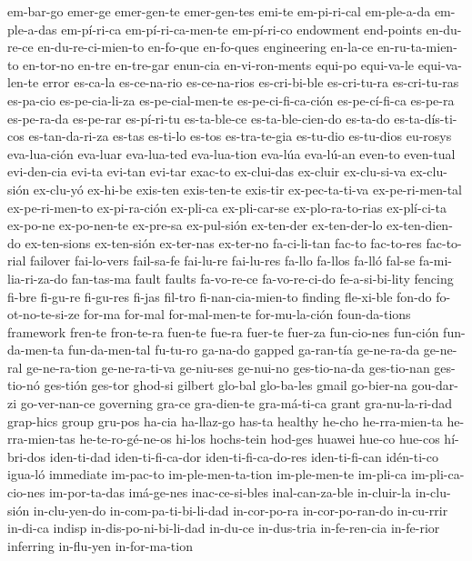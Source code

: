 {  em-bar-go emer-ge emer-gen-te emer-gen-tes emi-te em-pi-ri-cal
  em-ple-a-da em-ple-a-das em-pí-ri-ca em-pí-ri-ca-men-te em-pí-ri-co
  endowment end-points en-du-re-ce en-du-re-ci-mien-to en-fo-que
  en-fo-ques engineering en-la-ce en-ru-ta-mien-to en-tor-no en-tre
  en-tre-gar enun-cia en-vi-ron-ments equi-po equi-va-le equi-va-len-te
  error es-ca-la es-ce-na-rio es-ce-na-rios es-cri-bi-ble es-cri-tu-ra
  es-cri-tu-ras es-pa-cio es-pe-cia-li-za es-pe-cial-men-te
  es-pe-ci-fi-ca-ción es-pe-cí-fi-ca es-pe-ra es-pe-ra-da es-pe-rar
  es-pí-ri-tu es-ta-ble-ce es-ta-ble-cien-do es-ta-do es-ta-dís-ti-cos
  es-tan-da-ri-za es-tas es-ti-lo es-tos es-tra-te-gia es-tu-dio
  es-tu-dios eu-rosys eva-lua-ción eva-luar eva-lua-ted eva-lua-tion
  eva-lúa eva-lú-an even-to even-tual evi-den-cia evi-ta evi-tan
  evi-tar exac-to ex-clui-das ex-cluir ex-clu-si-va ex-clu-sión
  ex-clu-yó ex-hi-be exis-ten exis-ten-te exis-tir ex-pec-ta-ti-va
  ex-pe-ri-men-tal ex-pe-ri-men-to ex-pi-ra-ción ex-pli-ca
  ex-pli-car-se ex-plo-ra-to-rias ex-plí-ci-ta ex-po-ne ex-po-nen-te
  ex-pre-sa ex-pul-sión ex-ten-der ex-ten-der-lo ex-ten-dien-do
  ex-ten-sions ex-ten-sión ex-ter-nas ex-ter-no fa-ci-li-tan fac-to
  fac-to-res fac-to-rial failover fai-lo-vers fail-sa-fe fai-lu-re
  fai-lu-res fa-llo fa-llos fa-lló fal-se fa-mi-lia-ri-za-do fan-tas-ma
  fault faults fa-vo-re-ce fa-vo-re-ci-do fe-a-si-bi-lity fencing
  fi-bre fi-gu-re fi-gu-res fi-jas fil-tro fi-nan-cia-mien-to finding
  fle-xi-ble fon-do fo-ot-no-te-si-ze for-ma for-mal for-mal-men-te
  for-mu-la-ción foun-da-tions framework fren-te fron-te-ra fuen-te
  fue-ra fuer-te fuer-za fun-cio-nes fun-ción fun-da-men-ta
  fun-da-men-tal fu-tu-ro ga-na-do gapped ga-ran-tía ge-ne-ra-da
  ge-ne-ral ge-ne-ra-tion ge-ne-ra-ti-va ge-niu-ses ge-nui-no
  ges-tio-na-da ges-tio-nan ges-tio-nó ges-tión ges-tor ghod-si gilbert
  glo-bal glo-ba-les gmail go-bier-na gou-dar-zi go-ver-nan-ce
  governing gra-ce gra-dien-te gra-má-ti-ca grant gra-nu-la-ri-dad
  grap-hics group gru-pos ha-cia ha-llaz-go has-ta healthy he-cho
  he-rra-mien-ta he-rra-mien-tas he-te-ro-gé-ne-os hi-los hochs-tein
  hod-ges huawei hue-co hue-cos hí-bri-dos iden-ti-dad
  iden-ti-fi-ca-dor iden-ti-fi-ca-do-res iden-ti-fi-can idén-ti-co
  igua-ló immediate im-pac-to im-ple-men-ta-tion im-ple-men-te
  im-pli-ca im-pli-ca-cio-nes im-por-ta-das imá-ge-nes inac-ce-si-bles
  inal-can-za-ble in-cluir-la in-clu-sión in-clu-yen-do
  in-com-pa-ti-bi-li-dad in-cor-po-ra in-cor-po-ran-do in-cu-rrir
  in-di-ca indisp in-dis-po-ni-bi-li-dad in-du-ce in-dus-tria
  in-fe-ren-cia in-fe-rior inferring in-flu-yen in-for-ma-tion
}
